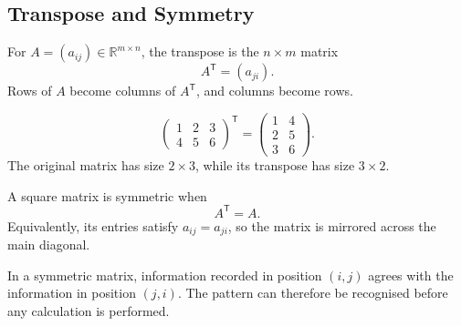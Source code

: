 \subsection{Transpose and Symmetry}

\begin{definitionbox}[Transpose]
For $A=(a_{ij})\in\mathbb R^{m\times n}$, the transpose is the
$n\times m$ matrix
\[
A^{\mathsf T}=(a_{ji}).
\]
Rows of $A$ become columns of $A^{\mathsf T}$, and columns become rows.
\end{definitionbox}

\begin{examplebox}
\[
\begin{pmatrix}
1&2&3\\
4&5&6
\end{pmatrix}^{\mathsf T}
=
\begin{pmatrix}
1&4\\
2&5\\
3&6
\end{pmatrix}.
\]
The original matrix has size $2\times3$, while its transpose has size
$3\times2$.
\end{examplebox}

\begin{definitionbox}
A square matrix is symmetric when
\[
A^{\mathsf T}=A.
\]
Equivalently, its entries satisfy $a_{ij}=a_{ji}$, so the matrix is mirrored
across the main diagonal.
\end{definitionbox}

\begin{interpretationbox}
In a symmetric matrix, information recorded in position $(i,j)$ agrees with the
information in position $(j,i)$. The pattern can therefore be recognised before
any calculation is performed.
\end{interpretationbox}
